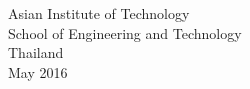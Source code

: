 \begin{center}
  \singlespace Asian Institute of Technology\\ School of Engineering
                  and Technology\\ Thailand\\ May 2016
\end{center}
\vfill







\newpage
{}
\tableofcontents


\newpage
{}
\listoffigures



\newpage
{}
\listoftables



\setlength{\parskip}{12pt}